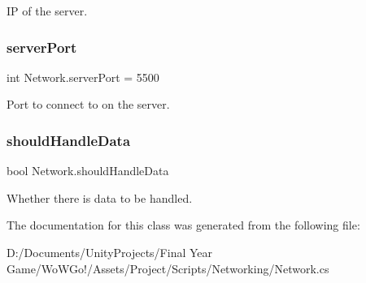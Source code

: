 IP of the server. 

\mbox{\label{class_network_a871eb8ca681b377dc341b4bf4df08367}} 
\subsubsection{\texorpdfstring{serverPort}{serverPort}}
{\footnotesize\ttfamily int Network.\+server\+Port = 5500}



Port to connect to on the server. 

\mbox{\label{class_network_a1df7f2025ab9462bf56814c17d5be87b}} 
\subsubsection{\texorpdfstring{shouldHandleData}{shouldHandleData}}
{\footnotesize\ttfamily bool Network.\+should\+Handle\+Data}



Whether there is data to be handled. 



The documentation for this class was generated from the following file\+:\begin{DoxyCompactItemize}
\item 
D\+:/\+Documents/\+Unity\+Projects/\+Final Year Game/\+Wo\+W\+Go!/\+Assets/\+Project/\+Scripts/\+Networking/Network.\+cs\end{DoxyCompactItemize}
